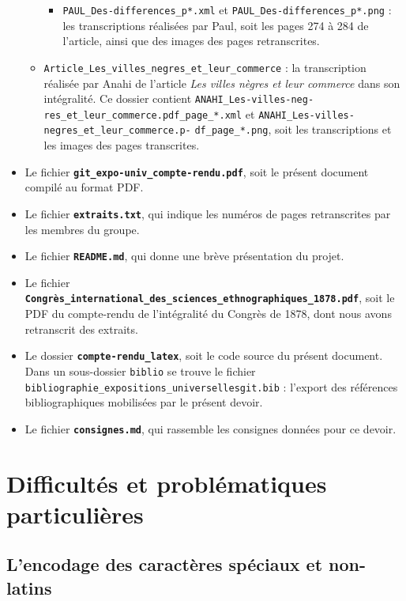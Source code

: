 \documentclass{article}
\begin{document}
\begin{itemize}
\begin{itemize}
\begin{itemize}
				\item 		\texttt{PAUL\_Des-differences\_p*.xml} et \texttt{PAUL\_Des-differences\_p*.png} : les transcriptions réalisées par Paul, soit les pages 274 à 284 de l'article, ainsi que des images des pages retranscrites.
			\end{itemize}
			\item \texttt{Article\_Les\_villes\_negres\_et\_leur\_commerce} : la transcription réalisée par Anahi de l'article \textit{Les villes nègres et leur commerce} dans son intégralité. Ce dossier contient \texttt{ANAHI\_Les-villes-neg-}
			\noindent \texttt{res\_et\_leur\_commerce.pdf\_page\_*.xml} et \texttt{ANAHI\_Les-villes-negres\_et\_leur\_commerce.p-}
			\noindent \texttt{df\_page\_*.png}, soit les transcriptions et les images des pages transcrites.
		\end{itemize}
		\item Le fichier \textbf{\texttt{git\_expo-univ\_compte-rendu.pdf}}, soit le présent document compilé au format PDF.
		\item Le fichier \textbf{\texttt{extraits.txt}}, qui indique les numéros de pages retranscrites par les membres du groupe.
		\item Le fichier \textbf{\texttt{README.md}}, qui donne une brève présentation du projet.
		\item Le fichier \textbf{\texttt{Congrès\_international\_des\_sciences\_ethnographiques\_1878.pdf}}, soit le PDF du compte-rendu de l'intégralité du Congrès de 1878, dont nous avons retranscrit des extraits.
		\item Le dossier \textbf{\texttt{compte-rendu\_latex}}, soit le code source du présent document. Dans un sous-dossier \texttt{biblio} se trouve le fichier \texttt{bibliographie\_expositions\_universellesgit.bib} : l'export des références bibliographiques mobilisées par le présent devoir.
		\item Le fichier \textbf{\texttt{consignes.md}}, qui rassemble les consignes données pour ce devoir.
	\end{itemize}
	
	
	\section{Difficultés et problématiques particulières}
	
	\subsection{L'encodage des caractères spéciaux et non-latins}
	
\end{document}
